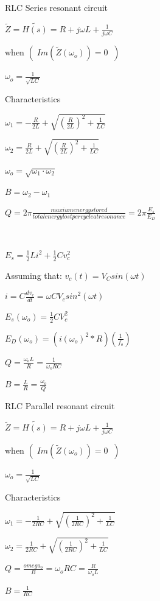 \documentclass[11pt]{article}
\begin{document}
\begin{section}{RLC Series resonant circuit}


$\tilde{Z} = \tilde{H(s)} = R + j \omega L + \frac{1}{j \omega C} $

 when $(\;  Im(\tilde{Z}(\omega_o)) = 0 \;\;)$ \ \   

 $\omega_o = \frac{1}{\sqrt{LC}}$
    
    
\begin{subsection}{ Characteristics } 

$\omega_1 = - \frac{R}{2L} + \sqrt{({\frac{R}{2L}})^2 + \frac{1}{LC}}$ \

$\omega_2 = \frac{R}{2L} + \sqrt{({\frac{R}{2L}})^2 + \frac{1}{LC}}$ \

$\omega_o = \sqrt{\omega_1 \cdot \omega_2}$ \ 

$B = \omega_2 - \omega_1$ \ 

$Q = 2 \pi \frac{ maxium energy stored}{total energy lost per cycle at resonance} = 2\pi \frac{E_s}{E_D}$ \

\

$E_s = \frac{1}{2}L i^2 + \frac{1}{2}C v_c^2$ \

Assuming that: $v_c(t) =  V_C sin(\omega t)$ \

$i = C \frac{dv_c}{dt} = \omega C V_c sin^2(\omega t)$ \

$E_s(\omega_o) = \frac{1}{2}C V_c^2$ \

 $ E_D(\omega_o) = (i(\omega_o)^2 * R) (\frac{1}{f_o}) $ \

 $Q = \frac{\omega_o L}{R} = \frac{1}{\omega_o RC}$ \

 $B = \frac{L}{R} = \frac{\omega_o}{Q}$ \

\end{subsection}
\end{section}



\begin{section}{RLC Parallel resonant circuit}

$\tilde{Z} = \tilde{H(s)} = R + j \omega L + \frac{1}{j \omega C} $

 when $(\;  Im(\tilde{Z}(\omega_o)) = 0 \;\;)$ \ \ 

    $\omega_o = \frac{1}{\sqrt{LC}}$ \
    

\begin{subsection}{Characteristics } \

$\omega_1 = - \frac{1}{2RC} + \sqrt{({\frac{1}{2RC}})^2 + \frac{1}{LC}}$ \

$\omega_2 = \frac{1}{2RC} + \sqrt{({\frac{1}{2RC}})^2 + \frac{1}{LC}}$

$Q = \frac{omega_o}{B} = \omega_o RC = \frac{R}{\omega_o L}$

$B = \frac{1}{RC} $



\end{subsection}
\end{section}
\end{document}
